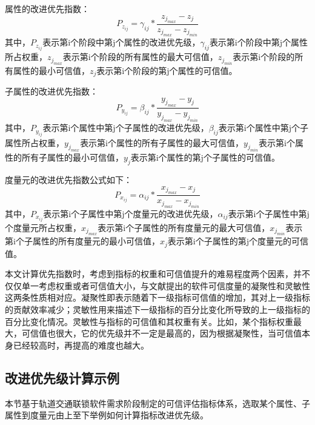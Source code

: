 属性的改进优先指数：
\begin{equation}
    P_{z_{ij}}=\gamma_{ij}*\frac{z_{j_{max}}-z_j}{z_{j_{max}}-z_{j_{min}}}
\end{equation}
其中，$P_{z_{ij}}$表示第i个阶段中第j个属性的改进优先级，$\gamma_{ij}$表示第i个阶段中第j个属性所占权重，$z_{j_{max}}$表示第i个阶段的所有属性的最大可信值，$z_{j_{min}}$表示第i个阶段的所有属性的最小可信值，$z_j$表示第i个阶段的第j个属性的可信值。

子属性的改进优先指数：
\begin{equation}
    P_{y_{ij}}=\beta_{ij}*\frac{y_{j_{max}}-y_j}{y_{j_{max}}-y_{j_{min}}}
\end{equation}
其中，$P_{y_{ij}}$表示第i个属性中第j个子属性的改进优先级，$\beta_{ij}$表示第i个属性中第j个子属性所占权重，$y_{j_{max}}$表示第i个属性的所有子属性的最大可信值，$y_{j_{min}}$表示第i个属性的所有子属性的最小可信值，$y_j$表示第i个属性的第j个子属性的可信值。

度量元的改进优先指数公式如下：
\begin{equation}
    P_{x_{ij}}=\alpha_{ij}*\frac{x_{j_{max}}-x_j}{x_{j_{max}}-x_{j_{min}}}
\end{equation}
其中，$P_{x_{ij}}$表示第i个子属性中第j个度量元的改进优先级，$\alpha_{ij}$表示第i个子属性中第j个度量元所占权重，$x_{j_{max}}$表示第i个子属性的所有度量元的最大可信值，$x_{j_{min}}$表示第i个子属性的所有度量元的最小可信值，$x_j$表示第i个子属性的第j个度量元的可信值。

本文计算优先指数时，考虑到指标的权重和可信值提升的难易程度两个因素，并不仅仅单一考虑权重或者可信值大小，与文献\cite{陶红伟2011基于属性的软件可信性度量模型研究}提出的软件可信度量的凝聚性和灵敏性这两条性质相对应。凝聚性即表示随着下一级指标可信值的增加，其对上一级指标的贡献效率减少；灵敏性用来描述下一级指标的百分比变化所导致的上一级指标的百分比变化情况\cite{陶红伟2011基于属性的软件可信性度量模型研究}。灵敏性与指标的可信值和其权重有关。比如，某个指标权重最大，可信值也很大，它的优先级并不一定是最高的，因为根据凝聚性，当可信值本身已经较高时，再提高的难度也越大。

\subsection{改进优先级计算示例}
本节基于轨道交通联锁软件需求阶段制定的可信评估指标体系，选取某个属性、子属性到度量元由上至下举例如何计算指标改进优先级。

